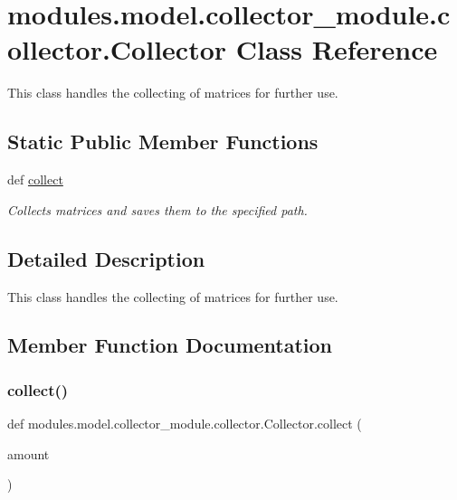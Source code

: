 \hypertarget{classmodules_1_1model_1_1collector__module_1_1collector_1_1_collector}{}\section{modules.\+model.\+collector\+\_\+module.\+collector.\+Collector Class Reference}
\label{classmodules_1_1model_1_1collector__module_1_1collector_1_1_collector}


This class handles the collecting of matrices for further use.  


\subsection*{Static Public Member Functions}
\begin{DoxyCompactItemize}
\item 
def \mbox{\hyperlink{classmodules_1_1model_1_1collector__module_1_1collector_1_1_collector_a11eda15a530022ad389cdf7a578eb049}{collect}}
\begin{DoxyCompactList}\small\item\em Collects matrices and saves them to the specified path. \end{DoxyCompactList}\end{DoxyCompactItemize}


\subsection{Detailed Description}
This class handles the collecting of matrices for further use. 

\subsection{Member Function Documentation}
\mbox{\label{classmodules_1_1model_1_1collector__module_1_1collector_1_1_collector_a11eda15a530022ad389cdf7a578eb049}} 
\subsubsection{\texorpdfstring{collect()}{collect()}}
{\footnotesize\ttfamily def modules.\+model.\+collector\+\_\+module.\+collector.\+Collector.\+collect (\begin{DoxyParamCaption}\item[{}]{amount }\end{DoxyParamCaption})\hspace{0.3cm}{\ttfamily [static]}}



